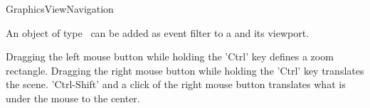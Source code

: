\begin{ccRefClass}[Qt::]{GraphicsViewNavigation}

\ccDefinition
An object of type \ccRefName\ can be added as event filter to a  and its viewport.

Dragging the left mouse button while holding the 'Ctrl' key defines a zoom rectangle.
Dragging the right mouse button while holding the 'Ctrl' key translates the scene.
'Ctrl-Shift' and a click of the right mouse button translates what is under the mouse to the center.




\ccOperations



\end{ccRefClass}







